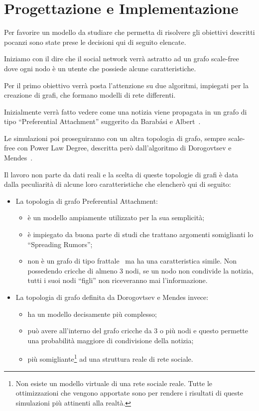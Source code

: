\section{Progettazione e Implementazione}
\label{section:progettazione}


Per favorire un modello da studiare che permetta di risolvere gli obiettivi descritti 
pocanzi sono state prese le decisioni qui di seguito elencate.

Iniziamo con il dire che il social network verrà astratto ad un grafo scale-free dove ogni 
nodo è un utente che possiede alcune caratteristiche.

Per il primo obiettivo verrà posta l'attenzione su due algoritmi, impiegati per la creazione di grafi, 
che formano modelli di rete differenti.

Inizialmente verrà fatto vedere come una notizia viene propagata in un grafo di tipo 
``Preferential Attachment'' suggerito da Barabási e Albert~\cite{biblio:barabasilab_emergence}.

Le simulazioni poi proseguiranno con un altra topologia di grafo, sempre scale-free 
con Power Law Degree, descritta però dall'algoritmo di Dorogovtsev e Mendes~\cite{biblio:evolution_networks}.

Il lavoro non parte da dati reali e la scelta di queste topologie di grafi è data 
dalla peculiarità di alcune loro caratteristiche che elencherò qui di seguito:
\begin{itemize}
 \item La topologia di grafo Preferential Attachment:
 \begin{itemize}
  \item è un modello ampiamente utilizzato per la sua semplicità;
  \item è impiegato da buona parte di studi che trattano argomenti somiglianti lo ``Spreading Rumors'';
  \item non è un grafo di tipo frattale~\cite{biblio:fractal_resistant_disease} ma ha una caratteristica simile. 
 Non possedendo cricche di almeno 3 nodi, se un nodo non condivide la notizia, 
 tutti i suoi nodi ``figli'' non riceveranno mai l'informazione.
 \end{itemize}
 
 \item La topologia di grafo definita da Dorogovtsev e Mendes invece:
  \begin{itemize}
  \item ha un modello decisamente più complesso;
  \item può avere all'interno del grafo cricche da 3 o più nodi e questo permette una probabilità maggiore di condivisione della notizia;
  \item più somigliante\footnote{\scriptsize Non esiste un modello virtuale di una rete sociale reale. 
  Tutte le ottimizzazioni che vengono apportate sono per rendere i risultati di queste simulazioni più attinenti alla realtà.}
  ad una struttura reale di rete sociale.
 \end{itemize}
\end{itemize}

